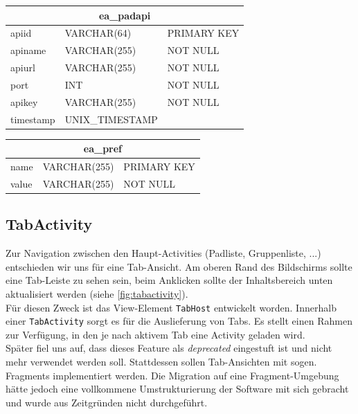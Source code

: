 \begin{table}[h!]
	\begin{center}
		\footnotesize
		\begin{tabular}{|p{2.5cm}|p{3.5cm}|p{3cm}|}
			\hline
			\multicolumn{3}{|c|}{\textbf{ea\_padapi}} \\ \hline
			\hline
			apiid 	& VARCHAR(64) 	& PRIMARY KEY \\ \hline
			apiname	& VARCHAR(255) 	& NOT NULL \\ \hline
			apiurl 	& VARCHAR(255) 	& NOT NULL \\ \hline
			port	& INT 			& NOT NULL \\ \hline
			apikey	& VARCHAR(255)	& NOT NULL \\ \hline
			timestamp & UNIX\_TIMESTAMP	&  \\ \hline
		\end{tabular}
	\end{center}
\end{table}

\begin{table}[h!]
	\begin{center}
		\footnotesize
		\begin{tabular}{|p{2.5cm}|p{3.5cm}|p{3cm}|}
			\hline
			\multicolumn{3}{|c|}{\textbf{ea\_pref}} \\ \hline
			\hline
			name 	& VARCHAR(255) 	& PRIMARY KEY \\ \hline
			value 	& VARCHAR(255) 	& NOT NULL \\ \hline
		\end{tabular}
	\end{center}
\end{table}


\subsection{TabActivity}
Zur Navigation zwischen den Haupt-Activities (Padliste, Gruppenliste, ...) entschieden wir uns für eine Tab-Ansicht.
Am oberen Rand des Bildschirms sollte eine Tab-Leiste zu sehen sein, beim Anklicken sollte der Inhaltsbereich unten aktualisiert werden (siehe \autoref{fig:tabactivity}).\\
Für diesen Zweck ist das View-Element \texttt{TabHost} entwickelt worden.
Innerhalb einer \texttt{TabActivity} sorgt es für die Auslieferung von Tabs.
Es stellt einen Rahmen zur Verfügung, in den je nach aktivem Tab eine Activity geladen wird.\\
Später fiel uns auf, dass dieses Feature als \textit{deprecated} eingestuft ist und nicht mehr verwendet werden soll.
Stattdessen sollen Tab-Ansichten mit sogen. Fragments implementiert werden.
Die Migration auf eine Fragment-Umgebung hätte jedoch eine vollkommene Umstrukturierung der Software mit sich gebracht und wurde aus Zeitgründen nicht durchgeführt.

